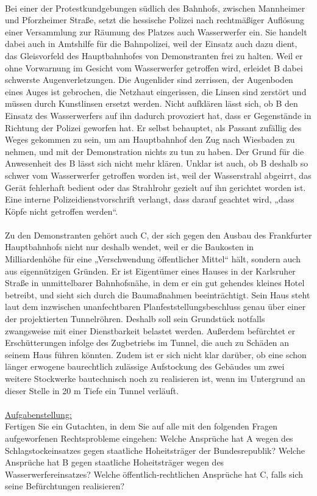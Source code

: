 \documentclass[widefront, ngerman]{jura}
\begin{document}
\begin{sachverhalt}
\\
Bei einer der Protestkundgebungen südlich des Bahnhofs, zwischen Mannheimer und Pforzheimer Straße, setzt die hessische Polizei nach rechtmäßiger Auflösung einer Versammlung zur Räumung des Platzes auch Wasserwerfer ein. Sie handelt dabei auch in Amtshilfe für die Bahnpolizei, weil der Einsatz auch dazu dient, das Gleisvorfeld des Hauptbahnhofes von Demonstranten frei zu halten. Weil er ohne Vorwarnung im Gesicht vom Wasserwerfer getroffen wird, erleidet B dabei schwerste Augenverletzungen. Die Augenlider sind zerrissen, der Augenboden eines Auges ist gebrochen, die Netzhaut eingerissen, die Linsen sind zerstört und müssen durch Kunstlinsen ersetzt werden. Nicht aufklären lässt sich, ob B den Einsatz des Wasserwerfers auf ihn dadurch provoziert hat, dass er Gegenstände in Richtung der Polizei geworfen hat. Er selbst behauptet, als Passant zufällig des Weges gekommen zu sein, um am Hauptbahnhof den Zug nach Wiesbaden zu nehmen, und mit der Demonstration nichts zu tun zu haben. Der Grund für die Anwesenheit des B lässt sich nicht mehr klären. Unklar ist auch, ob B deshalb so schwer vom Wasserwerfer getroffen worden ist, weil der Wasserstrahl abgeirrt, das Gerät fehlerhaft bedient oder das Strahlrohr gezielt auf ihn gerichtet worden ist. Eine interne Polizeidienstvorschrift verlangt, dass darauf geachtet wird, „dass Köpfe nicht getroffen werden“.\\
\\
Zu den Demonstranten gehört auch C, der sich gegen den Ausbau des Frankfurter Hauptbahnhofs nicht nur deshalb wendet, weil er die Baukosten in Milliardenhöhe für eine „Verschwendung öffentlicher Mittel“ hält, sondern auch aus eigennützigen Gründen. Er ist Eigentümer eines Hauses in der Karlsruher Straße in unmittelbarer Bahnhofsnähe, in dem er ein gut gehendes kleines Hotel betreibt, und sieht sich durch die Baumaßnahmen beeinträchtigt. Sein Haus steht laut dem inzwischen unanfechtbaren Planfeststellungsbeschluss genau über einer der projektierten Tunnelröhren. Deshalb soll sein Grundstück notfalls zwangsweise mit einer Dienstbarkeit belastet werden. Außerdem befürchtet er Erschütterungen infolge des Zugbetriebs im Tunnel, die auch zu Schäden an seinem Haus führen könnten. Zudem ist er sich nicht klar darüber, ob eine schon länger erwogene baurechtlich zulässige Aufstockung des Gebäudes um zwei weitere Stockwerke bautechnisch noch zu realisieren ist, wenn im Untergrund an dieser Stelle in 20 m Tiefe ein Tunnel verläuft.\\
\\
\underline{Aufgabenstellung:}\\
Fertigen Sie ein Gutachten, in dem Sie auf alle mit den folgenden Fragen aufgeworfenen Rechtsprobleme eingehen: Welche Ansprüche hat A wegen des Schlagstockeinsatzes gegen staatliche Hoheitsträger der Bundesrepublik? Welche Ansprüche hat B gegen staatliche Hoheitsträger wegen des Wasserwerfereinsatzes? Welche öffentlich-rechtlichen Ansprüche hat C, falls sich seine Befürchtungen realisieren?
\end{sachverhalt}
\end{document}
